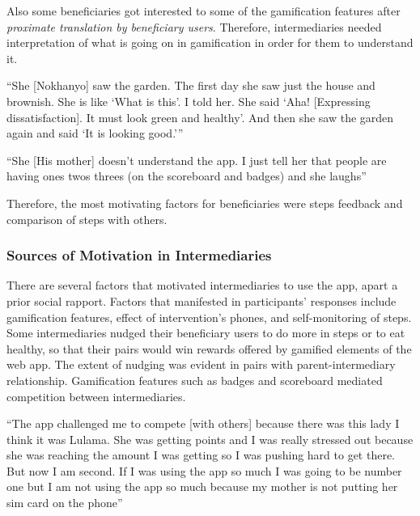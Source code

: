 Also some beneficiaries got interested to some of the gamification features after \emph{proximate translation by beneficiary users}. Therefore, intermediaries needed interpretation of what is going on in gamification in order for them to understand it.

 {``She [Nokhanyo] saw the garden. The
first day she saw just the house and brownish. She
is like `What is this'. I told her. She said `Aha! [Expressing
dissatisfaction]. It must look green and healthy'. And then
she saw the garden again and said `It is looking good.'''}  

 {``She [His mother] doesn't understand the app. I just tell her that people are having ones twos threes (on the scoreboard and badges) and she laughs''} 

Therefore, the most motivating factors for beneficiaries were steps feedback and comparison of steps with others. 
\subsubsection{Sources of Motivation in Intermediaries}
There are several factors that motivated intermediaries to use the app, apart a prior social rapport. Factors that manifested in participants' responses include gamification features, effect of intervention's phones, and self-monitoring of steps. Some intermediaries nudged their beneficiary
users to do more in steps or to eat healthy, so that their pairs would win rewards offered by gamified elements of the web app. The extent of nudging was evident in pairs with parent-intermediary relationship. Gamification features such as badges and scoreboard mediated competition between intermediaries.

{``The app challenged me to compete [with others] because there was this lady I think it was Lulama. She was getting points and I was really stressed out because she was reaching the amount I was getting so I was pushing hard to get there. But now I am second. If I was using the app so much I was going to be number one but I am not using the app so much because my mother is not putting her sim card on the phone''}

